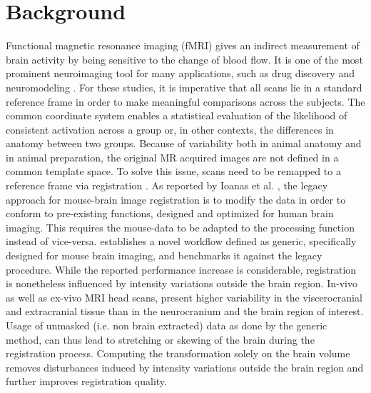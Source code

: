 \section{Background}
Functional magnetic resonance imaging (fMRI) gives an indirect measurement of brain activity by being sensitive to the change of blood flow. It is one of the most prominent neuroimaging tool for many applications, such as drug discovery \cite{https://www.nature.com/articles/nrd2027} and neuromodeling \cite{https://www.sciencedirect.com/science/article/pii/S1053811903002027}.
For these studies, it is imperative that all scans lie in a standard reference frame in order to make meaningful comparisons across the subjects.
The common coordinate system enables a statistical evaluation of the likelihood of consistent activation across a group or, in other contexts, the differences in anatomy between two groups.
Because of variability both in animal anatomy and in animal preparation, the original MR acquired images are not defined in a common template space.
To solve this issue, scans need to be remapped to a reference frame via registration \cite{maintz_overview_nodate, sotiras_deformable_2013}.
As reported by Ioanas et al. \cite{ioanas_optimized_2019}, the legacy approach for mouse-brain image registration is to modify the data in order to conform to pre-existing functions, designed and optimized for human brain imaging.
This requires the mouse-data to be adapted to the processing function instead of vice-versa.
\cite{ioanas_optimized_2019} establishes a novel workflow defined as generic, specifically designed for mouse brain imaging, and benchmarks it against the legacy procedure.
While the reported performance increase is considerable, registration is nonetheless influenced by intensity variations outside the brain region.
In-vivo as well as ex-vivo MRI head scans, present higher variability in the viscerocranial and extracranial tissue than in the neurocranium and the brain region of interest.
Usage of unmasked (i.e. non brain extracted) data as done by the generic method, can thus lead to stretching or skewing of the brain during the registration process.
Computing the transformation solely on the brain volume removes disturbances induced by intensity variations outside the brain region and further improves registration quality.

